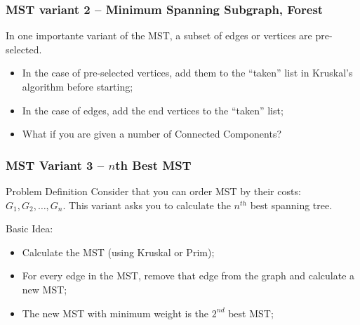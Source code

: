 \documentclass{beamer}
\begin{document}
\begin{frame}
  \frametitle{MST variant 2 -- Minimum Spanning Subgraph, Forest}
  {\smaller
    \begin{block}{}
      In one importante variant of the MST, a subset of edges or
      vertices are pre-selected.

      \begin{itemize}
      \item In the case of pre-selected vertices, add them to the
        ``taken'' list in Kruskal's algorithm before starting;
      \item In the case of edges, add the end vertices to the
        ``taken'' list;
      \item What if you are given a \alert{number of Connected Components}?
      \end{itemize}
    \end{block}
    \begin{center}
    \end{center}
  }
\end{frame}

\begin{frame}
  \frametitle{MST Variant 3 -- $n$th Best MST}
  {\smaller
  \begin{block}{Problem Definition}
    Consider that you can order MST by their costs: $G_1, G_2, \ldots,
    G_n$.  This variant asks you to calculate the $n^{th}$ best
    spanning tree.    
  \end{block}

  \bigskip

  Basic Idea:
  \begin{itemize}
    \item Calculate the MST (using Kruskal or Prim);
    \item For every edge in the MST, remove that edge from the graph
      and calculate a new MST;
    \item The new MST with minimum weight is the $2^{nd}$ best MST;
  \end{itemize}
}
\end{frame}
\end{document}
